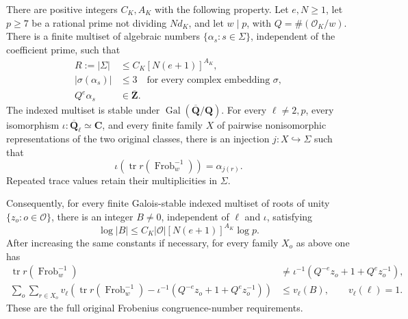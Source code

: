 \begin{theorem}
\label{thm:support-spectrum}
There are positive integers $C_K,A_K$ with the following property.
Let $e,N\ge1$, let $p\ge7$ be a rational prime not dividing
$Nd_K$, and let $w\mid p$, with $Q=\#(\mathcal O_K/w)$.
There is a finite multiset of algebraic numbers
$\{\alpha_s:s\in\Sigma\}$, independent of the coefficient prime,
such that
\[
 \begin{split}
 R:=|\Sigma|&\le C_K[N(e+1)]^{A_K},\\
 |\sigma(\alpha_s)|&\le3
       \quad\text{for every complex embedding }\sigma,\\
 Q^e\alpha_s&\in\overline{\mathbf Z}.
 \end{split}                                                   \tag{SP3}
\]
The indexed multiset is stable under
$\operatorname{Gal}(\overline{\mathbf Q}/\mathbf Q)$.
For every $\ell\ne2,p$, every isomorphism
$\iota:\overline{\mathbf Q}_\ell\simeq\mathbf C$, and every
finite family $X$ of pairwise nonisomorphic representations of the
two original classes, there is an injection $j:X\hookrightarrow\Sigma$
such that
\[
 \iota\!\left(\operatorname{tr}r(\operatorname{Frob}_w^{-1})\right)
                 =\alpha_{j(r)}.                              \tag{SP4}
\]
Repeated trace values retain their multiplicities in $\Sigma$.

Consequently, for every finite Galois-stable indexed multiset
of roots of unity $\{z_o:o\in\mathcal O\}$, there is an integer
$B\ne0$, independent of $\ell$ and $\iota$, satisfying
\[
 \log|B|\le C_K|\mathcal O|[N(e+1)]^{A_K}\log p.                \tag{SP5}
\]
After increasing the same constants if necessary, for every family
$X_o$ as above one has
\[
 \begin{split}
 \operatorname{tr}r(\operatorname{Frob}_w^{-1})
   &\ne\iota^{-1}(Q^{-e}z_o+1+Q^ez_o^{-1}),\\
 \sum_o\sum_{r\in X_o}v_\ell\!\left(
   \operatorname{tr}r(\operatorname{Frob}_w^{-1})
      -\iota^{-1}(Q^{-e}z_o+1+Q^ez_o^{-1})\right)
   &\le v_\ell(B),\qquad v_\ell(\ell)=1.
 \end{split}                                                   \tag{SP6}
\]
These are the full original Frobenius congruence-number requirements.
\end{theorem}

